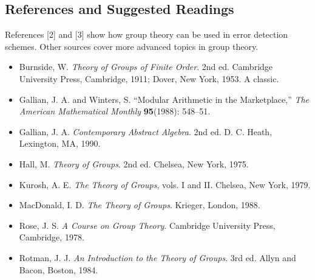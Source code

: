  
 
\subsection*{References and Suggested Readings} %
 
 
{\small
References [2] and [3] show  how group theory can be used in error
detection schemes.  Other sources cover more advanced
topics in group theory. 
\begin{itemize}
 
\item[{\bf [1]}]
Burnside, W. {\it Theory of Groups of Finite Order}. 2nd ed. Cambridge
University Press, Cambridge, 1911; Dover, New York, 1953.  A classic. 
 
\item[{\bf [2]}]
Gallian, J. A. and Winters, S. ``Modular Arithmetic in the
Marketplace,'' {\it The American Mathematical Monthly} {\bf
95}(1988): 548--51. 
 
\item[{\bf [3]}]
Gallian, J. A. {\it Contemporary Abstract Algebra}. 2nd ed. D. C.
Heath, Lexington, MA, 1990.
 
\item[{\bf [4]}]
Hall, M. {\it Theory of Groups}. 2nd ed. Chelsea, New York, 1975.
 
\item[{\bf [5]}]
Kurosh, A. E. {\it The Theory of Groups}, vols. I and II. Chelsea, New
York, 1979. 
 
\item[{\bf [6]}]
MacDonald, I. D. {\it The Theory of Groups}. Krieger, London, 1988.
 
\item[{\bf [7]}]
Rose, J. S. {\it A Course on Group Theory}. Cambridge University
Press, Cambridge, 1978.
 
 
\item[{\bf [8]}]
Rotman, J. J. {\it An Introduction to the Theory of Groups}. 3rd ed.
Allyn and Bacon, Boston, 1984. 
 
\end{itemize}
}
 
 
 
